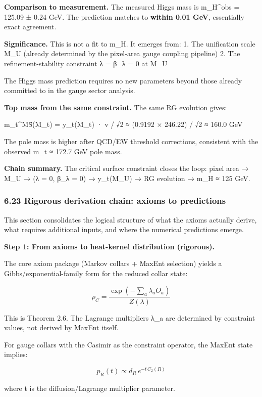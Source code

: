 \documentclass[
]{article}
\begin{document}
\textbf{Comparison to measurement.} The measured Higgs mass is
m\_H\^{}obs = 125.09 ± 0.24 GeV. The prediction matches to
\textbf{within 0.01 GeV}, essentially exact agreement.

\textbf{Significance.} This is not a fit to m\_H. It emerges from: 1.
The unification scale M\_U (already determined by the pixel-area gauge
coupling pipeline) 2. The refinement-stability constraint λ = β\_λ = 0
at M\_U

The Higgs mass prediction requires no new parameters beyond those
already committed to in the gauge sector analysis.

\textbf{Top mass from the same constraint.} The same RG evolution gives:

m\_t\^{}MS̄(M\_t) = y\_t(M\_t) · v / √2 ≈ (0.9192 × 246.22) / √2 ≈ 160.0
GeV

The pole mass is higher after QCD/EW threshold corrections, consistent
with the observed m\_t ≈ 172.7 GeV pole mass.

\textbf{Chain summary.} The critical surface constraint closes the loop:
pixel area → M\_U → (λ = 0, β\_λ = 0) → y\_t(M\_U) → RG evolution → m\_H
≈ 125 GeV.

\subsubsection{6.23 Rigorous derivation chain: axioms to
predictions}\label{rigorous-derivation-chain-axioms-to-predictions}

This section consolidates the logical structure of what the axioms
actually derive, what requires additional inputs, and where the
numerical predictions emerge.

\textbf{Step 1: From axioms to heat-kernel distribution (rigorous).}

The core axiom package (Markov collars + MaxEnt selection) yields a
Gibbs/exponential-family form for the reduced collar state:

\[
\rho_C = \frac{\exp(-\sum_a \lambda_a O_a)}{Z(\lambda)}
\]

This is Theorem 2.6. The Lagrange multipliers λ\_a are determined by
constraint values, not derived by MaxEnt itself.

For gauge collars with the Casimir as the constraint operator, the
MaxEnt state implies:

\[
p_R(t) \propto d_R \, e^{-t \, C_2(R)}
\]

where t is the diffusion/Lagrange multiplier parameter.
\end{document}
